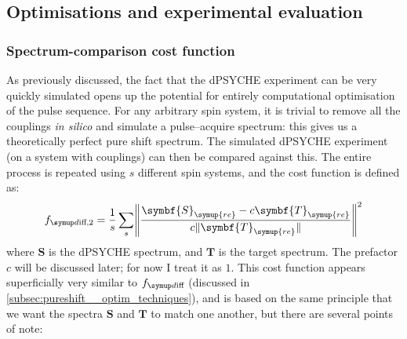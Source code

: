 \subsection{Optimisations and experimental evaluation}
\label{subsec:pureshift__dpsyche_optimisation}


\subsubsection{Spectrum-comparison cost function}

As previously discussed, the fact that the dPSYCHE experiment can be very quickly simulated opens up the potential for entirely computational optimisation of the pulse sequence.
For any arbitrary spin system, it is trivial to remove all the couplings \textit{in silico} and simulate a pulse--acquire spectrum: this gives us a theoretically perfect pure shift spectrum.
The simulated dPSYCHE experiment (on a system with couplings) can then be compared against this.
The entire process is repeated using $s$ different spin systems, and the cost function is defined as:
\begin{equation}
    \label{eq:f_diff_dpsyche}
    \fdifftwo = \frac{1}{s}\sum_s \Biggl\lVert \frac{\symbf{S}_{\symup{re}} - c\symbf{T}_{\symup{re}}}{c\lVert \symbf{T}_{\symup{re}} \rVert} \Biggr\rVert^2
\end{equation}
where $\symbf{S}$ is the dPSYCHE spectrum, and $\symbf{T}$ is the target spectrum.
The prefactor $c$ will be discussed later; for now I treat it as $1$.
This cost function appears superficially very similar to $\fdiff$ (discussed in \cref{subsec:pureshift__optim_techniques}), and is based on the same principle that we want the spectra $\symbf{S}$ and $\symbf{T}$ to match one another, but there are several points of note:
